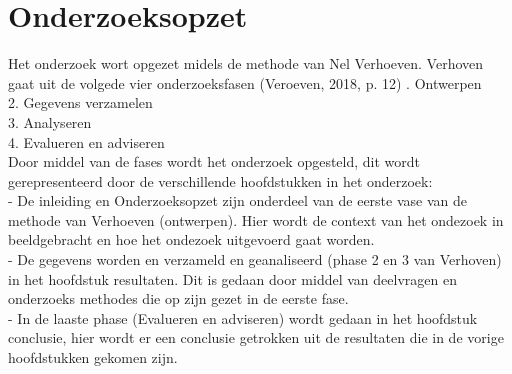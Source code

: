 \section{Onderzoeksopzet}
Het onderzoek wort opgezet midels de methode van Nel Verhoeven. Verhoven gaat uit de volgede vier onderzoeksfasen (Veroeven, 2018, p. 12)
. Ontwerpen \\
2. Gegevens verzamelen \\
3. Analyseren \\
4. Evalueren en adviseren \\
\whitespace
Door middel van de fases wordt het onderzoek opgesteld, dit wordt gerepresenteerd door de verschillende hoofdstukken in het onderzoek: \\
- De inleiding en Onderzoeksopzet zijn onderdeel van de eerste vase van de methode van Verhoeven (ontwerpen).
Hier wordt de context van het ondezoek in beeldgebracht en hoe het ondezoek uitgevoerd gaat worden. \\ 
- De gegevens worden en verzameld en geanaliseerd (phase 2 en 3 van Verhoven) in het hoofdstuk resultaten.
Dit is gedaan door middel van deelvragen en onderzoeks methodes die op zijn gezet in de eerste fase.\\ 
- In de laaste phase (Evalueren en adviseren) wordt gedaan in het hoofdstuk conclusie, hier wordt er een conclusie getrokken uit de resultaten die in de vorige hoofdstukken gekomen zijn.

